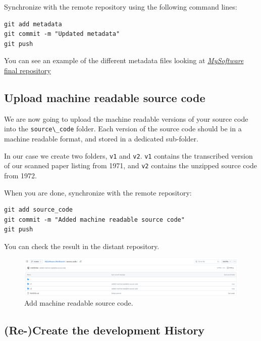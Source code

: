 \documentclass[]{article}
\newcommand{\passthrough}[1]{#1}
\begin{document}
Synchronize with the remote repository using the following command
lines:

\begin{lstlisting}
git add metadata
git commit -m "Updated metadata"
git push
\end{lstlisting}

You can see an example of the different metadata files looking at
\href{https://github.com/mathfichen/MySoftware/tree/master/metadata}{\emph{MySoftware}
final repository}

\hypertarget{upload-machine-readable-source-code}{%
\subsection{Upload machine readable source
code}\label{upload-machine-readable-source-code}}

We are now going to upload the machine readable versions of your source
code into the \passthrough{\lstinline!source\_code!} folder. Each
version of the source code should be in a machine readable format, and
stored in a dedicated sub-folder.

In our case we create two folders, \passthrough{\lstinline!v1!} and
\passthrough{\lstinline!v2!}. \passthrough{\lstinline!v1!} contains the
transcribed version of our scanned paper listing from 1971, and
\passthrough{\lstinline!v2!} contains the unzipped source code from
1972.

When you are done, synchronize with the remote repository:

\begin{lstlisting}
git add source_code
git commit -m "Added machine readable source code"
git push
\end{lstlisting}

You can check the result in the distant repository.

\begin{figure}
\hypertarget{fig:RawMaterials_local}{%
\centering
\includegraphics{./media2/14_addedSourceCode.png}
\caption{Add machine readable source
code.}\label{fig:RawMaterials_local}
}
\end{figure}

\hypertarget{re-create-the-development-history}{%
\subsection{(Re-)Create the development
History}\label{re-create-the-development-history}}
\end{document}
